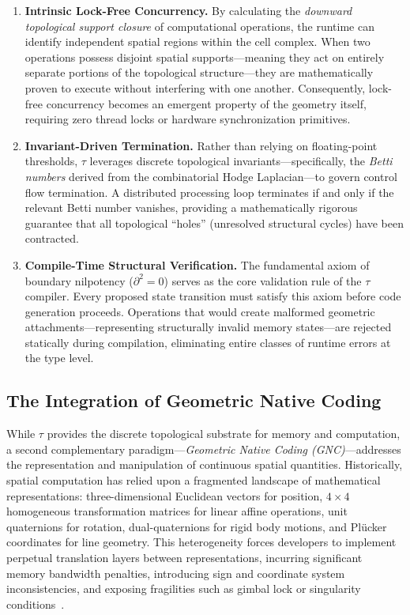 \documentclass[manuscript, nonacm, review=false]{acmart}
\theoremstyle{definition}
\theoremstyle{plain}
\newcommand{\toposLang}{\ensuremath{\tau}\text{-Lang}}
\begin{document}
\begin{enumerate}[label=(\roman*)]
    \item \textbf{Intrinsic Lock-Free Concurrency.} By calculating the \emph{downward topological support closure} of computational operations, the runtime can identify independent spatial regions within the cell complex. When two operations possess disjoint spatial supports---meaning they act on entirely separate portions of the topological structure---they are mathematically proven to execute without interfering with one another. Consequently, lock-free concurrency becomes an emergent property of the geometry itself, requiring zero thread locks or hardware synchronization primitives.
    
    \item \textbf{Invariant-Driven Termination.} Rather than relying on floating-point thresholds, \toposLang{} leverages discrete topological invariants---specifically, the \emph{Betti numbers} derived from the combinatorial Hodge Laplacian---to govern control flow termination. A distributed processing loop terminates if and only if the relevant Betti number vanishes, providing a mathematically rigorous guarantee that all topological ``holes'' (unresolved structural cycles) have been contracted.
    
    \item \textbf{Compile-Time Structural Verification.} The fundamental axiom of boundary nilpotency ($\partial^2 = 0$) serves as the core validation rule of the \toposLang{} compiler. Every proposed state transition must satisfy this axiom before code generation proceeds. Operations that would create malformed geometric attachments---representing structurally invalid memory states---are rejected statically during compilation, eliminating entire classes of runtime errors at the type level.
\end{enumerate}


\subsection{The Integration of Geometric Native Coding}
\label{subsec:gnc_intro}

While \toposLang{} provides the discrete topological substrate for memory and computation, a second complementary paradigm---\emph{Geometric Native Coding (GNC)}---addresses the representation and manipulation of continuous spatial quantities. Historically, spatial computation has relied upon a fragmented landscape of mathematical representations: three-dimensional Euclidean vectors for position, $4 \times 4$ homogeneous transformation matrices for linear affine operations, unit quaternions for rotation, dual-quaternions for rigid body motions, and Pl\"ucker coordinates for line geometry. This heterogeneity forces developers to implement perpetual translation layers between representations, incurring significant memory bandwidth penalties, introducing sign and coordinate system inconsistencies, and exposing fragilities such as gimbal lock or singularity conditions~\cite{hildenbrand2012}.
\end{document}
